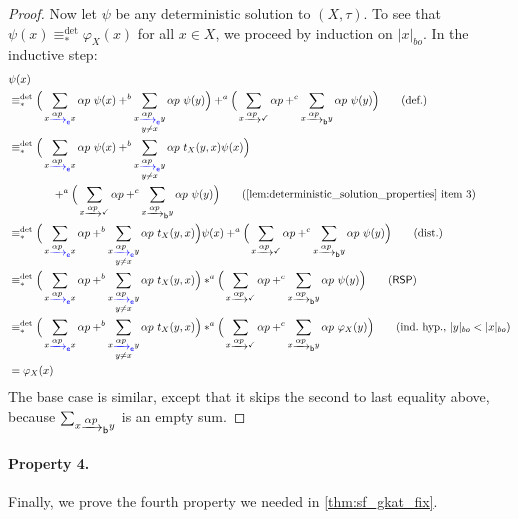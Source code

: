 \documentclass[orivec,envcountsect,envcountsame]{llncs}
\begin{document}
\begin{proof}
	Now let \(\psi\) be any deterministic solution to \((X,\tau)\).
	To see that \(\psi(x) \equiv_*^{\det} \varphi_X(x)\) for all \(x \in X\), we proceed by induction on \(|x|_{bo}\).
	In the inductive step:
	\begin{align*}
		&\psi(x)  \\
		&\equiv_*^{\det}  \Big(\sum_{x \etr{\alpha p} x} \alpha p~\psi(x) +^b \sum_{\substack{x\etr{\alpha p} y \\ y \neq x}} \alpha p~\psi(y) \Big) +^{a} \Big(\sum_{x \tr{\alpha p} \checkmark} \alpha p +^{c} \sum_{\substack{x \btr{\alpha p}y}} \alpha p ~\psi(y)\Big)
		\tag{def.} \\
		&\equiv_*^{\det} \Big(\sum_{x \etr{\alpha p} x} \alpha p~\psi(x) +^b \sum_{\substack{x\etr{\alpha p} y \\ y \neq x}} \alpha p~t_X(y,x)\psi(x) \Big) \\&\hspace{4em}+^{a} \Big(\sum_{x \tr{\alpha p} \checkmark} \alpha p +^{c} \sum_{\substack{x \btr{\alpha p}y}} \alpha p ~\psi(y)\Big)
		\tag{\Cref{lem:deterministic_solution_properties} item 3}\\
		&\equiv_*^{\det} \Big(\sum_{x \etr{\alpha p} x} \alpha p +^b \sum_{\substack{x\etr{\alpha p} y \\ y \neq x}} \alpha p~t_X(y,x) \Big)\psi(x) +^{a} \Big(\sum_{x \tr{\alpha p} \checkmark} \alpha p +^{c} \sum_{\substack{x \btr{\alpha p}y}} \alpha p ~\psi(y)\Big)
		\tag{dist.} \\
		&\equiv_*^{\det}  \Big(\sum_{x \etr{\alpha p} x} \alpha p +^b \sum_{\substack{x\etr{\alpha p} y \\ y \neq x}} \alpha p~t_X(y,x) \Big)*^{a} \Big(\sum_{x \tr{\alpha p} \checkmark} \alpha p +^{c} \sum_{\substack{x \btr{\alpha p}y}} \alpha p ~\psi(y)\Big)
		\tag{\textsf{RSP}} \\
		&\equiv_*^{\det}  \Big(\sum_{x \etr{\alpha p} x} \alpha p +^b \sum_{\substack{x\etr{\alpha p} y \\ y \neq x}} \alpha p~t_X(y,x) \Big)*^{a} \Big(\sum_{x \tr{\alpha p} \checkmark} \alpha p +^{c} \sum_{\substack{x \btr{\alpha p}y}} \alpha p ~\varphi_X(y)\Big) \tag{ind.~hyp., \(|y|_{bo} < |x|_{bo}\)}\\
		&= \varphi_X(x)
	\end{align*}
	The base case is similar, except that it skips the second to last equality above, because \(\sum_{x \btr{\alpha p} y}\) is an empty sum.
\end{proof}

\paragraph*{Property 4.} Finally, we prove the fourth property we needed in \cref{thm:sf_gkat_fix}.
\end{document}
